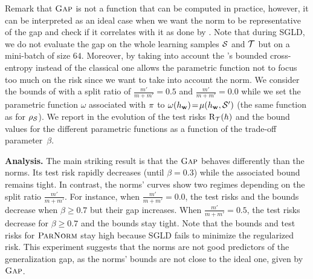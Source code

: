\documentclass[twoside]{article}
\theoremstyle{plain}
\begin{document}
Remark that $\gap$ is not a function that can be computed in practice, however, it can be interpreted as an ideal case when we want the norm to be representative of the gap and check if it correlates with it as done by \citet{jiang2019predicting}.
Note that during SGLD, we do not evaluate the gap on the whole learning samples $\Scal$ and $\Tcal$ but on a mini-batch of size $64$.
Moreover, by taking into account the \citet{dziugaite2018data}'s bounded cross-entropy instead of the classical one allows the parametric function not to focus too much on the risk since we want to take into account the norm.
We consider the bounds of  with a split ratio of \mbox{$\frac{m'}{m+m'}\!=\!0.5$} and \mbox{$\frac{m'}{m+m'}\!=\!0.0$} while we set the parametric function $\omega$ associated with $\P$ to \mbox{$\omega(h_\wbf)\!=\!\comp(h_\wbf, \Scal')$} (the same function as for $\AQ$).
We report in  the evolution of the test risks $\Risk_{\Tcal}(h)$ and the bound values for the different parametric functions as a function of the trade-off \mbox{parameter $\beta$}.

\textbf{Analysis.}
The main striking result is that the $\gap$ behaves differently than the norms.
Its test risk rapidly decreases (until $\beta\!=\!0.3$) while the associated bound remains tight. 
In contrast, the norms' curves show two regimes depending on the split ratio $\frac{m'}{m+m'}$.
For instance, when $\frac{m'}{m+m'}\!=\!0.0$, the test risks and the bounds decrease when $\beta\!\ge\!0.7$ but their gap increases.
When $\frac{m'}{m+m'}\!=\!0.5$, the test risks decrease for $\beta\!\ge\!0.7$ and the bounds stay tight.
Note that the bounds and test risks for $\paramnorm$ stay high because SGLD fails to minimize the regularized risk.
This experiment suggests that the norms are not good predictors of the generalization gap, as the norms' bounds are not close to the ideal one, given by $\gap$. 
\end{document}
